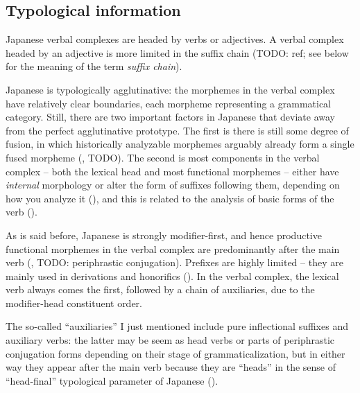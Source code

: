 \documentclass[UTF8, a4paper, oneside, scheme=plain]{ctexrep}
\newcommand*{\term}[1]{\emph{#1}}
\begin{document}
\subsection{Typological information}

Japanese verbal complexes are headed by verbs or adjectives.
A verbal complex headed by an adjective is more limited 
in the suffix chain (TODO: ref; see below for the meaning of the term \term{suffix chain}).

Japanese is typologically agglutinative:
the morphemes in the verbal complex have relatively clear boundaries,
each morpheme representing a grammatical category.
Still, there are two important factors in Japanese that deviate away 
from the perfect agglutinative prototype.
The first is there is still some degree of fusion, 
in which historically analyzable morphemes arguably already form a single fused morpheme 
(, TODO).
The second is most components in the verbal complex 
-- both the lexical head and most functional morphemes --
either have \emph{internal} morphology or alter the form of suffixes following them,
depending on how you analyze it (),
and this is related to the analysis of basic forms of the verb ().

As is said before, Japanese is strongly modifier-first,
and hence productive functional morphemes in the verbal complex are predominantly after the main verb
(, TODO: periphrastic conjugation).
Prefixes are highly limited -- they are mainly used in derivations and honorifics ().
In the verbal complex, the lexical verb always comes the first,
followed by a chain of auxiliaries,
due to the modifier-head constituent order.

The so-called ``auxiliaries'' I just mentioned include 
pure inflectional suffixes and auxiliary verbs:
the latter may be seem as head verbs or parts of periphrastic conjugation forms
depending on their stage of grammaticalization,
but in either way they appear after the main verb because they are ``heads'' 
in the sense of ``head-final'' typological parameter of Japanese ().
\end{document}
